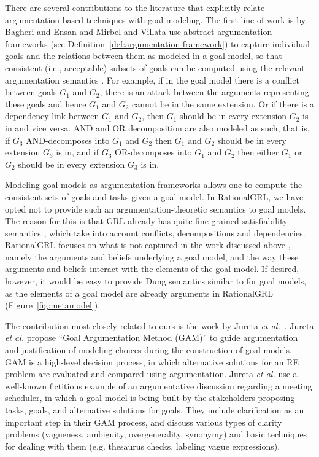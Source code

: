 There are several contributions to the literature that explicitly relate argumentation-based techniques with goal modeling. The first line of work is by Bagheri and Ensan \cite{bagheri2011consolidating} and Mirbel and Villata \cite{MirbelVillata12} use abstract argumentation frameworks (see Definition~\ref{def:argumentation-framework}) to capture individual goals and the relations between them as modeled in a goal model, so that consistent (i.e., acceptable) subsets of goals can be computed using the relevant argumentation semantics \cite{Dung1995}. For example, if in the goal model there is a conflict between goals $G_1$ and $G_2$, there is an attack between the arguments representing these goals and hence $G_1$ and $G_2$ cannot be in the same extension. Or if there is a dependency link between $G_1$ and $G_2$, then $G_1$ should be in every extension $G_2$ is in and vice versa. AND and OR decomposition are also modeled as such, that is, if $G_3$ AND-decomposes into $G_1$ and $G_2$ then $G_1$ and $G_2$ should be in every extension $G_3$ is in, and if $G_3$ OR-decomposes into $G_1$ and $G_2$ then either $G_1$ or $G_2$ should be in every extension $G_3$ is in. 

Modeling goal models as argumentation frameworks allows one to compute the consistent sets of goals and tasks given a goal model. In RationalGRL, we have opted not to provide such an argumentation-theoretic semantics to goal models. The reason for this is that GRL already has quite fine-grained satisfiability semantics \cite{Amyot:2010:EGM:1841349.1841356}, which take into account conflicts, decompositions and dependencies. RationalGRL focuses on what is not captured in the work discussed above \cite{bagheri2011consolidating,MirbelVillata12}, namely the arguments and beliefs underlying a goal model, and the way these arguments and beliefs interact with the elements of the goal model. If desired, however, it would be easy to provide Dung semantics similar to \cite{bagheri2011consolidating,MirbelVillata12} for goal models, as the elements of a goal model are already arguments in RationalGRL (Figure~\ref{fig:metamodel}). 

The contribution most closely related to ours is the work by Jureta \emph{et al.}~\cite{Jureta:RE2008}. Jureta \emph{et al.} propose ``Goal Argumentation Method (GAM)'' to guide argumentation and justification of modeling choices during the construction of goal models. GAM is a high-level decision process, in which alternative solutions for an RE problem are evaluated and compared using argumentation. Jureta \emph{et al.} use a well-known fictitious example of an argumentative discussion regarding a meeting scheduler, in which a goal model is being built by the stakeholders proposing tasks, goals, and alternative solutions for goals. They include clarification as an important step in their GAM process, and discuss various types of clarity problems (vagueness, ambiguity, overgenerality, synonymy) and basic techniques for dealing with them (e.g. thesaurus checks, labeling vague expressions). 


